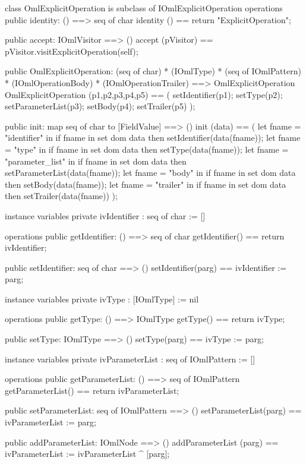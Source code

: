 \begin{vdm_al}
class OmlExplicitOperation is subclass of IOmlExplicitOperation
operations
  public identity: () ==> seq of char
  identity () == return "ExplicitOperation";

  public accept: IOmlVisitor ==> ()
  accept (pVisitor) == pVisitor.visitExplicitOperation(self);

  public OmlExplicitOperation:
      (seq of char) *
      (IOmlType) *
      (seq of IOmlPattern) *
      (IOmlOperationBody) *
      (IOmlOperationTrailer) ==> OmlExplicitOperation
  OmlExplicitOperation (p1,p2,p3,p4,p5) == 
   ( setIdentifier(p1);
     setType(p2);
     setParameterList(p3);
     setBody(p4);
     setTrailer(p5) );

  public init: map seq of char to [FieldValue] ==> ()
  init (data) ==
    ( let fname = "identifier" in
        if fname in set dom data
        then setIdentifier(data(fname));
      let fname = "type" in
        if fname in set dom data
        then setType(data(fname));
      let fname = "parameter_list" in
        if fname in set dom data
        then setParameterList(data(fname));
      let fname = "body" in
        if fname in set dom data
        then setBody(data(fname));
      let fname = "trailer" in
        if fname in set dom data
        then setTrailer(data(fname)) );

instance variables
  private ivIdentifier : seq of char := []

operations
  public getIdentifier: () ==> seq of char
  getIdentifier() == return ivIdentifier;

  public setIdentifier: seq of char ==> ()
  setIdentifier(parg) == ivIdentifier := parg;

instance variables
  private ivType : [IOmlType] := nil

operations
  public getType: () ==> IOmlType
  getType() == return ivType;

  public setType: IOmlType ==> ()
  setType(parg) == ivType := parg;

instance variables
  private ivParameterList : seq of IOmlPattern := []

operations
  public getParameterList: () ==> seq of IOmlPattern
  getParameterList() == return ivParameterList;

  public setParameterList: seq of IOmlPattern ==> ()
  setParameterList(parg) == ivParameterList := parg;

  public addParameterList: IOmlNode ==> ()
  addParameterList (parg) == ivParameterList := ivParameterList ^ [parg];


\end{vdm_al}
